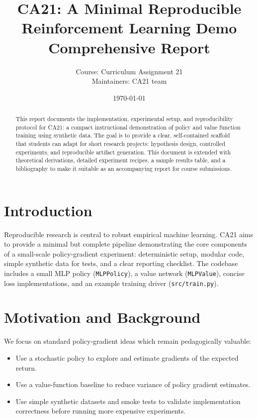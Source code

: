 \documentclass[11pt,a4paper]{article}
\title{CA21: A Minimal Reproducible Reinforcement Learning Demo\\\large Comprehensive Report}
\author{Course: Curriculum Assignment 21 \\ Maintainers: CA21 team}
\date{\today}
\newcommand{\code}[1]{\texttt{#1}}
\begin{document}
\maketitle
\begin{abstract}
This report documents the implementation, experimental setup, and reproducibility protocol for CA21: a compact instructional demonstration of policy and value function training using synthetic data. The goal is to provide a clear, self-contained scaffold that students can adapt for short research projects: hypothesis design, controlled experiments, and reproducible artifact generation. This document is extended with theoretical derivations, detailed experiment recipes, a sample results table, and a bibliography to make it suitable as an accompanying report for course submissions.
\end{abstract}

\tableofcontents
\clearpage

\section{Introduction}
Reproducible research is central to robust empirical machine learning. CA21 aims to provide a minimal but complete pipeline demonstrating the core components of a small-scale policy-gradient experiment: deterministic setup, modular code, simple synthetic data for tests, and a clear reporting checklist. The codebase includes a small MLP policy (\code{MLPPolicy}), a value network (\code{MLPValue}), concise loss implementations, and an example training driver (\code{src/train.py}).

\section{Motivation and Background}
We focus on standard policy-gradient ideas which remain pedagogically valuable:
\begin{itemize}
  \item Use a stochastic policy to explore and estimate gradients of the expected return.
  \item Use a value-function baseline to reduce variance of policy gradient estimates.
  \item Use simple synthetic datasets and smoke tests to validate implementation correctness before running more expensive experiments.
\end{itemize}
\end{document}

